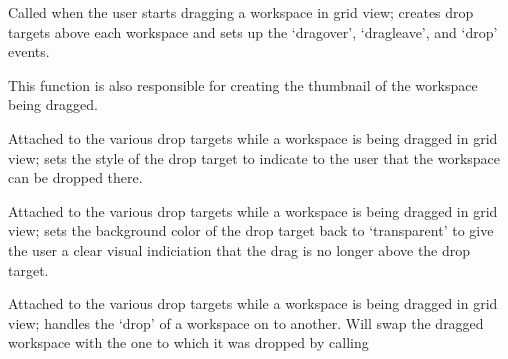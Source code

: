 \documentclass[letterpaper,10pt,openany]{sphinxmanual}
\begin{document}
\begin{fulllineitems}
\begin{fulllineitems}
\begin{fulllineitems}
\label{Developer/js_gateone:GateOne.Visual.gridWorkspaceDragStart}
Called when the user starts dragging a workspace in grid view; creates drop targets above each workspace and sets up the `dragover', `dragleave', and `drop' events.

This function is also responsible for creating the thumbnail of the workspace being dragged.

\end{fulllineitems}



\begin{fulllineitems}
\label{Developer/js_gateone:GateOne.Visual.gridWorkspaceDragOver}
Attached to the various drop targets while a workspace is being dragged in grid view; sets the style of the drop target to indicate to the user that the workspace can be dropped there.

\end{fulllineitems}



\begin{fulllineitems}
\label{Developer/js_gateone:GateOne.Visual.gridWorkspaceDragLeave}
Attached to the various drop targets while a workspace is being dragged in grid view; sets the background color of the drop target back to `transparent' to give the user a clear visual indiciation that the drag is no longer above the drop target.

\end{fulllineitems}



\begin{fulllineitems}
\label{Developer/js_gateone:GateOne.Visual.gridWorkspaceDrop}
Attached to the various drop targets while a workspace is being dragged in grid view; handles the `drop' of a workspace on to another.  Will swap the dragged workspace with the one to which it was dropped by calling {\hyperref[Developer/js_gateone:GateOne.Visual.swapWorkspaces]{}}

\end{fulllineitems}




\end{fulllineitems}
\end{fulllineitems}
\end{document}
